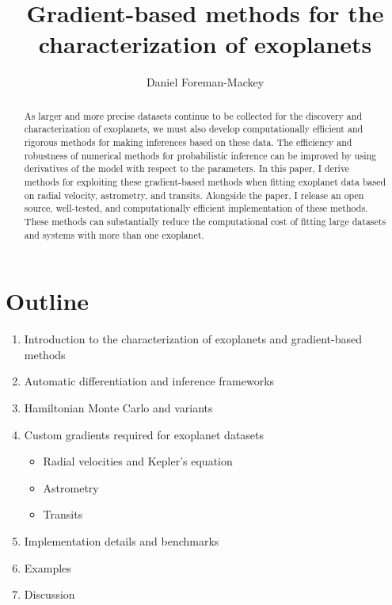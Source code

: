 \documentclass[modern]{aastex62}
\begin{document}
\raggedbottom\sloppy\sloppypar\frenchspacing

\title{%
Gradient-based methods for the characterization of exoplanets
}

\author[0000-0002-9328-5652]{Daniel Foreman-Mackey}

\begin{abstract}

As larger and more precise datasets continue to be collected for the discovery
and characterization of exoplanets, we must also develop computationally
efficient and rigorous methods for making inferences based on these data.
The efficiency and robustness of numerical methods for probabilistic inference
can be improved by using derivatives of the model with respect to the
parameters.
In this paper, I derive methods for exploiting these gradient-based methods
when fitting exoplanet data based on radial velocity, astrometry, and
transits.
Alongside the paper, I release an open source, well-tested, and
computationally efficient implementation of these methods.
These methods can substantially reduce the computational cost of fitting large
datasets and systems with more than one exoplanet.

\end{abstract}


\section{Outline}

\begin{enumerate}

\item Introduction to the characterization of exoplanets and gradient-based
methods

\item Automatic differentiation and inference frameworks

\item Hamiltonian Monte Carlo and variants

\item Custom gradients required for exoplanet datasets
\begin{itemize}
\item Radial velocities and Kepler's equation
\item Astrometry
\item Transits
\end{itemize}

\item Implementation details and benchmarks

\item Examples

\item Discussion

\end{enumerate}
\end{document}
